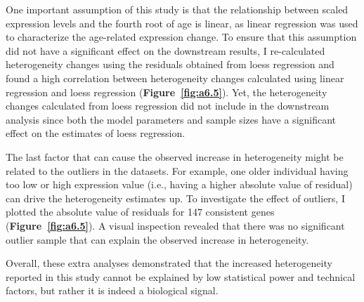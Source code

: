 One important assumption of this study is that the relationship between scaled expression levels and the fourth root of age is linear,
as linear regression was used to characterize the age-related expression change.
To ensure that this assumption did not have a significant effect on the downstream results, 
I re-calculated heterogeneity changes using the residuals obtained from loess regression and 
found a high correlation between heterogeneity changes calculated using linear regression and loess regression (\textbf{Figure~\ref{fig:a6.5}}).
Yet, the heterogeneity changes calculated from loess regression did not include in the downstream analysis
since both the model parameters and sample sizes have a significant effect on the estimates of loess regression.

The last factor that can cause the observed increase in heterogeneity might be related to the outliers in the datasets.
For example, one older individual having too low or high expression value (i.e., having a higher absolute value of residual) 
can drive the heterogeneity estimates up.
To investigate the effect of outliers, I plotted the absolute value of residuals for 147 consistent genes (\textbf{Figure~\ref{fig:a6.5}}).
A visual inspection revealed that there was no significant outlier sample that can explain the observed increase in heterogeneity.

Overall, these extra analyses demonstrated that the increased heterogeneity reported in this study cannot be explained by low statistical power and technical factors,
but rather it is indeed a biological signal.

